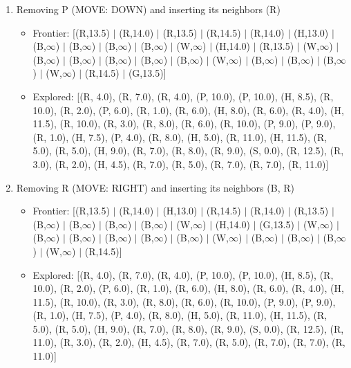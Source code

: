\documentclass[12pt]{article}
\begin{document}
\begin{enumerate}
\item Removing P (MOVE: DOWN) and inserting its neighbors (R)
\begin{itemize}
\item Frontier: [(R,13.5) \(|\) (R,14.0) \(|\) (R,13.5) \(|\) (R,14.5) \(|\) (R,14.0) \(|\) (H,13.0) \(|\) (B,\(\infty\)) \(|\) (B,\(\infty\)) \(|\) (B,\(\infty\)) \(|\) (B,\(\infty\)) \(|\) (W,\(\infty\)) \(|\) (H,14.0) \(|\) (R,13.5) \(|\) (W,\(\infty\)) \(|\) (B,\(\infty\)) \(|\) (B,\(\infty\)) \(|\) (B,\(\infty\)) \(|\) (B,\(\infty\)) \(|\) (B,\(\infty\)) \(|\) (W,\(\infty\)) \(|\) (B,\(\infty\)) \(|\) (B,\(\infty\)) \(|\) (B,\(\infty\)) \(|\) (W,\(\infty\)) \(|\) (R,14.5) \(|\) (G,13.5)]
\item Explored: [(R, 4.0), (R, 7.0), (R, 4.0), (P, 10.0), (P, 10.0), (H, 8.5), (R, 10.0), (R, 2.0), (P, 6.0), (R, 1.0), (R, 6.0), (H, 8.0), (R, 6.0), (R, 4.0), (H, 11.5), (R, 10.0), (R, 3.0), (R, 8.0), (R, 6.0), (R, 10.0), (P, 9.0), (P, 9.0), (R, 1.0), (H, 7.5), (P, 4.0), (R, 8.0), (H, 5.0), (R, 11.0), (H, 11.5), (R, 5.0), (R, 5.0), (H, 9.0), (R, 7.0), (R, 8.0), (R, 9.0), (S, 0.0), (R, 12.5), (R, 3.0), (R, 2.0), (H, 4.5), (R, 7.0), (R, 5.0), (R, 7.0), (R, 7.0), (R, 11.0)]
\end{itemize}

\item Removing R (MOVE: RIGHT) and inserting its neighbors (B, R)
\begin{itemize}
\item Frontier: [(R,13.5) \(|\) (R,14.0) \(|\) (H,13.0) \(|\) (R,14.5) \(|\) (R,14.0) \(|\) (R,13.5) \(|\) (B,\(\infty\)) \(|\) (B,\(\infty\)) \(|\) (B,\(\infty\)) \(|\) (B,\(\infty\)) \(|\) (W,\(\infty\)) \(|\) (H,14.0) \(|\) (G,13.5) \(|\) (W,\(\infty\)) \(|\) (B,\(\infty\)) \(|\) (B,\(\infty\)) \(|\) (B,\(\infty\)) \(|\) (B,\(\infty\)) \(|\) (B,\(\infty\)) \(|\) (W,\(\infty\)) \(|\) (B,\(\infty\)) \(|\) (B,\(\infty\)) \(|\) (B,\(\infty\)) \(|\) (W,\(\infty\)) \(|\) (R,14.5)]
\item Explored: [(R, 4.0), (R, 7.0), (R, 4.0), (P, 10.0), (P, 10.0), (H, 8.5), (R, 10.0), (R, 2.0), (P, 6.0), (R, 1.0), (R, 6.0), (H, 8.0), (R, 6.0), (R, 4.0), (H, 11.5), (R, 10.0), (R, 3.0), (R, 8.0), (R, 6.0), (R, 10.0), (P, 9.0), (P, 9.0), (R, 1.0), (H, 7.5), (P, 4.0), (R, 8.0), (H, 5.0), (R, 11.0), (H, 11.5), (R, 5.0), (R, 5.0), (H, 9.0), (R, 7.0), (R, 8.0), (R, 9.0), (S, 0.0), (R, 12.5), (R, 11.0), (R, 3.0), (R, 2.0), (H, 4.5), (R, 7.0), (R, 5.0), (R, 7.0), (R, 7.0), (R, 11.0)]
\end{itemize}


\end{enumerate}
\end{document}
